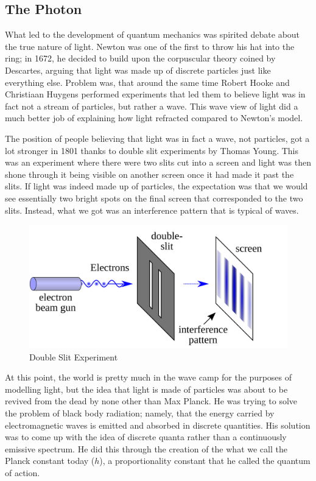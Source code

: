 \subsection{The Photon}

What led to the development of quantum mechanics was spirited debate about the true nature of light.
Newton was one of the first to throw his hat into the ring; in 1672, he decided to build upon the corpuscular theory coined by Descartes, arguing that light was made up of discrete particles just like everything else\cite{Newton_1948}.
Problem was, that around the same time Robert Hooke and Christiaan Huygens performed experiments that led them to believe light was in fact not a stream of particles, but rather a wave\cite{Hooke_1667}\cite{Huygens_1690}.
This wave view of light did a much better job of explaining how light refracted compared to Newton's model.

The position of people believing that light was in fact a wave, not particles, got a lot stronger in 1801 thanks to double slit experiments by Thomas Young.
This was an experiment where there were two slits cut into a screen and light was then shone through it being visible on another screen once it had made it past the slits.
If light was indeed made up of particles, the expectation was that we would see essentially two bright spots on the final screen that corresponded to the two slits.
Instead, what we got was an interference pattern that is typical of waves\cite{Young_1804}.

\begin{figure}[H]
  \centering
  \includegraphics[width=130mm]{figures/doubleSlit.png}
  \caption{Double Slit Experiment\cite{DS_experiment}}
  \label{doubleSlit}
\end{figure}

At this point, the world is pretty much in the wave camp for the purposes of modelling light, but the idea that light is made of particles was about to be revived from the dead by none other than Max Planck.
He was trying to solve the problem of black body radiation; namely, that the energy carried by electromagnetic waves is emitted and absorbed in discrete quantities.
His solution was to  come up with the idea of discrete quanta rather than a continuously emissive spectrum.
He did this through the creation of the what we call the Planck constant today ($h$), a proportionality constant that he called the quantum of action\cite{Planck_1901}.

